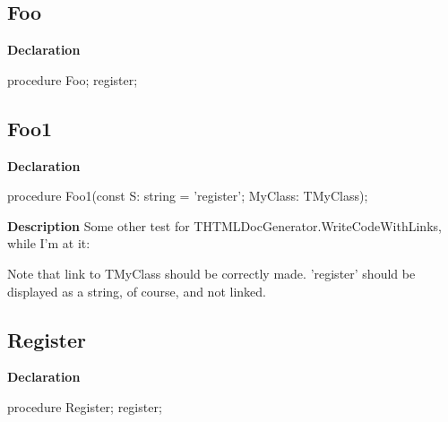 \documentclass{report}
\begin{document}
\subsection*{Foo}
\begin{list}{}{
\setlength{\itemindent}{0cm}
\setlength{\listparindent}{0cm}
\setlength{\leftmargin}{\evensidemargin}
\addtolength{\leftmargin}{\tmplength}
\settowidth{\labelsep}{X}
\addtolength{\leftmargin}{\labelsep}
\setlength{\labelwidth}{\tmplength}
}
\begin{flushleft}
\item[\textbf{Declaration}\hfill]
\begin{ttfamily}
procedure Foo; register;\end{ttfamily}


\end{flushleft}
\end{list}
\subsection*{Foo1}
\begin{list}{}{
\setlength{\itemindent}{0cm}
\setlength{\listparindent}{0cm}
\setlength{\leftmargin}{\evensidemargin}
\addtolength{\leftmargin}{\tmplength}
\settowidth{\labelsep}{X}
\addtolength{\leftmargin}{\labelsep}
\setlength{\labelwidth}{\tmplength}
}
\begin{flushleft}
\item[\textbf{Declaration}\hfill]
\begin{ttfamily}
procedure Foo1(const S: string = 'register'; MyClass: TMyClass);\end{ttfamily}


\end{flushleft}
\par
\item[\textbf{Description}]
Some other test for THTMLDocGenerator.WriteCodeWithLinks, while I'm at it:

Note that link to TMyClass should be correctly made. 'register' should be displayed as a string, of course, and not linked.

\end{list}
\subsection*{Register}
\begin{list}{}{
\setlength{\itemindent}{0cm}
\setlength{\listparindent}{0cm}
\setlength{\leftmargin}{\evensidemargin}
\addtolength{\leftmargin}{\tmplength}
\settowidth{\labelsep}{X}
\addtolength{\leftmargin}{\labelsep}
\setlength{\labelwidth}{\tmplength}
}
\begin{flushleft}
\item[\textbf{Declaration}\hfill]
\begin{ttfamily}
procedure Register; register;\end{ttfamily}


\end{flushleft}
\end{list}
\end{document}
